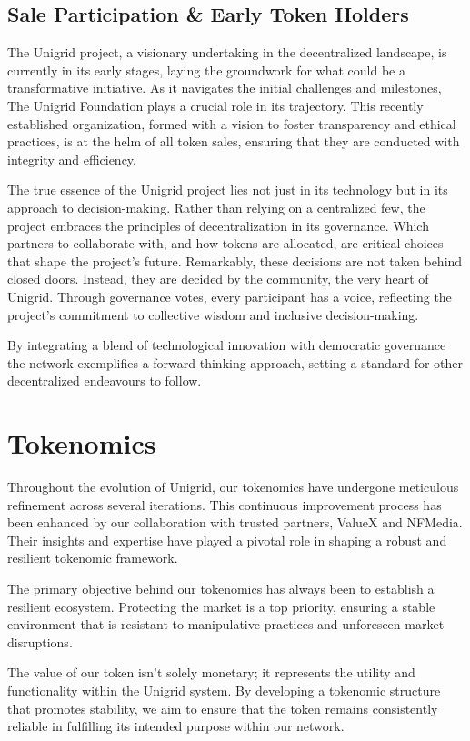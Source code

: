 \documentclass[a4paper,oneside]{article}
\begin{document}
\subsection{Sale Participation \& Early Token Holders}
The Unigrid project, a visionary undertaking in the decentralized landscape, is currently in its early stages, laying the groundwork for what could be a transformative initiative. As it navigates the initial challenges and milestones, The Unigrid Foundation plays a crucial role in its trajectory. This recently established organization, formed with a vision to foster transparency and ethical practices, is at the helm of all token sales, ensuring that they are conducted with integrity and efficiency.

The true essence of the Unigrid project lies not just in its technology but in its approach to decision-making. Rather than relying on a centralized few, the project embraces the principles of decentralization in its governance. Which partners to collaborate with, and how tokens are allocated, are critical choices that shape the project's future. Remarkably, these decisions are not taken behind closed doors. Instead, they are decided by the community, the very heart of Unigrid. Through governance votes, every participant has a voice, reflecting the project's commitment to collective wisdom and inclusive decision-making.

By integrating a blend of technological innovation with democratic governance the network exemplifies a forward-thinking approach, setting a standard for other decentralized endeavours to follow.

\newpage
\section{Tokenomics}
Throughout the evolution of Unigrid, our tokenomics have undergone meticulous refinement across several iterations. This continuous improvement process has been enhanced by our collaboration with trusted partners, ValueX and NFMedia. Their insights and expertise have played a pivotal role in shaping a robust and resilient tokenomic framework.

The primary objective behind our tokenomics has always been to establish a resilient ecosystem. Protecting the market is a top priority, ensuring a stable environment that is resistant to manipulative practices and unforeseen market disruptions.

The value of our token isn't solely monetary; it represents the utility and functionality within the Unigrid system. By developing a tokenomic structure that promotes stability, we aim to ensure that the token remains consistently reliable in fulfilling its intended purpose within our network.
\end{document}
